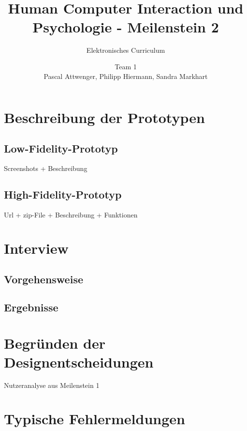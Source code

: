 \documentclass[a4paper,10pt]{scrartcl}
\title{Human Computer Interaction und Psychologie - Meilenstein 2}
\subtitle{Elektronisches Curriculum}
\author{Team 1 \\Pascal Attwenger, Philipp Hiermann, Sandra Markhart}
\begin{document}
\maketitle

\section*{Beschreibung der Prototypen}

\subsection*{Low-Fidelity-Prototyp}

Screenshots + Beschreibung

\subsection*{High-Fidelity-Prototyp}

Url + zip-File + Beschreibung + Funktionen

\section*{Interview}

\subsection*{Vorgehensweise}

\subsection*{Ergebnisse}

\section*{Begründen der Designentscheidungen}
Nutzeranalyse aus Meilenstein 1

\section*{Typische Fehlermeldungen}
\end{document}
